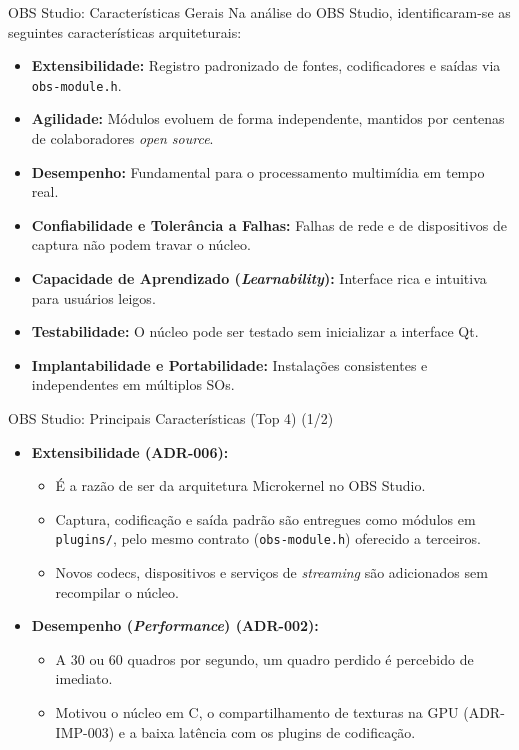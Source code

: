 \documentclass[aspectratio=169]{beamer}
\begin{document}

\begin{frame}{OBS Studio: Características Gerais}
Na análise do OBS Studio, identificaram-se as seguintes características arquiteturais:
\begin{itemize}\setlength{\itemsep}{0.4em}
\item \textbf{Extensibilidade:} Registro padronizado de fontes, codificadores e saídas via \texttt{obs-module.h}.
\item \textbf{Agilidade:} Módulos evoluem de forma independente, mantidos por centenas de colaboradores \textit{open source}.
\item \textbf{Desempenho:} Fundamental para o processamento multimídia em tempo real.
\item \textbf{Confiabilidade e Tolerância a Falhas:} Falhas de rede e de dispositivos de captura não podem travar o núcleo.
\item \textbf{Capacidade de Aprendizado (\textit{Learnability}):} Interface rica e intuitiva para usuários leigos.
\item \textbf{Testabilidade:} O núcleo pode ser testado sem inicializar a interface Qt.
\item \textbf{Implantabilidade e Portabilidade:} Instalações consistentes e independentes em múltiplos SOs.
\end{itemize}
\end{frame}

\begin{frame}{OBS Studio: Principais Características (Top 4) (1/2)}
\begin{itemize}\setlength{\itemsep}{0.8em}
\item \textbf{Extensibilidade (ADR-006):}
  \begin{itemize}
  \item É a razão de ser da arquitetura Microkernel no OBS Studio.
  \item Captura, codificação e saída padrão são entregues como módulos em \texttt{plugins/}, pelo mesmo contrato (\texttt{obs-module.h}) oferecido a terceiros.
  \item Novos codecs, dispositivos e serviços de \textit{streaming} são adicionados sem recompilar o núcleo.
  \end{itemize}
\item \textbf{Desempenho (\textit{Performance}) (ADR-002):}
  \begin{itemize}
  \item A 30 ou 60 quadros por segundo, um quadro perdido é percebido de imediato.
  \item Motivou o núcleo em C, o compartilhamento de texturas na GPU (ADR-IMP-003) e a baixa latência com os plugins de codificação.
  \end{itemize}
\end{itemize}
\end{frame}
\end{document}
